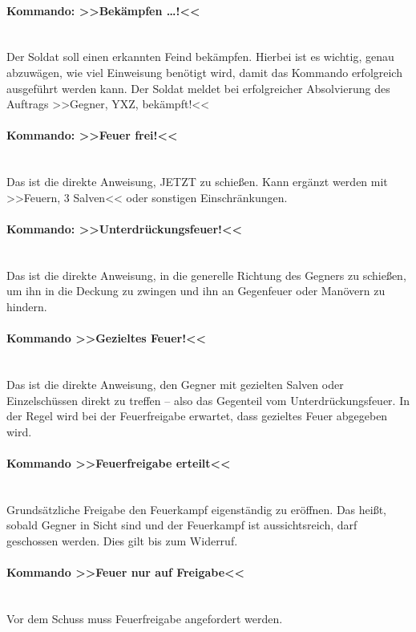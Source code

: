 \paragraph*{Kommando: >>Bekämpfen  \dots!<<}\hfil\\
	Der Soldat soll einen erkannten Feind bekämpfen. Hierbei ist es wichtig, genau abzuwägen, wie viel Einweisung benötigt wird, damit das Kommando erfolgreich ausgeführt werden kann. Der Soldat meldet bei erfolgreicher Absolvierung des Auftrags >>Gegner, YXZ, bekämpft!<<

\paragraph*{Kommando: >>Feuer frei!<<}\hfil\\
	Das ist die direkte Anweisung, JETZT zu schießen. Kann ergänzt werden mit >>Feuern, 3 Salven<< oder sonstigen Einschränkungen.

\paragraph*{Kommando: >>Unterdrückungsfeuer!<<}\ \\
	Das ist die direkte Anweisung, in die generelle Richtung des Gegners zu schießen, um ihn in die Deckung zu zwingen und ihn an Gegenfeuer oder Manövern zu hindern.

\paragraph*{Kommando >>Gezieltes Feuer!<<}\hfil\\
	Das ist die direkte Anweisung, den Gegner mit gezielten Salven oder Einzelschüssen direkt zu treffen -- also das Gegenteil vom Unterdrückungsfeuer. In der Regel wird bei der Feuerfreigabe erwartet, dass gezieltes Feuer abgegeben wird.

\paragraph*{Kommando >>Feuerfreigabe erteilt<<}\hfil\\
	Grundsätzliche Freigabe den Feuerkampf eigenständig zu eröffnen. Das heißt, sobald Gegner in Sicht sind und der Feuerkampf ist aussichtsreich, darf geschossen werden. Dies gilt bis zum Widerruf.

\paragraph*{Kommando >>Feuer nur auf Freigabe<<}\hfil\\
	Vor dem Schuss muss Feuerfreigabe angefordert werden.

